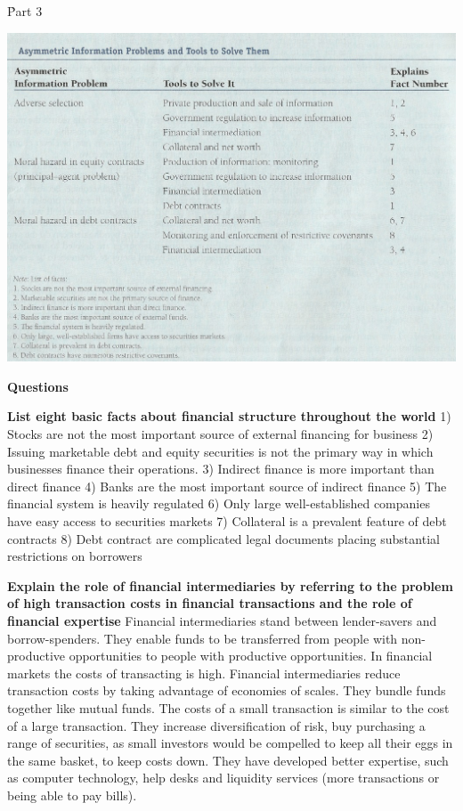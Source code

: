 \documentclass[12pt]{examnotes}
\begin{document}
\h{Part 3}
\begin{center}
  \includegraphics[scale=0.5]{./imgs/part3table.jpg}
\end{center}


\textbf{Questions}

\textbf{List eight basic facts about financial structure throughout the world}
1) Stocks are not the most important source of external financing for business
2) Issuing marketable debt and equity securities is not the primary way in which businesses finance their operations.
3) Indirect finance is more important than direct finance
4) Banks are the most important source of indirect finance
5) The financial system is heavily regulated
6) Only large well-established companies have easy access to securities markets
7) Collateral is a prevalent feature of debt contracts
8) Debt contract are complicated legal documents placing substantial restrictions on borrowers 

\textbf{Explain the role of financial intermediaries by referring to the problem of high transaction costs in financial transactions and the role of financial expertise}
Financial intermediaries stand between lender-savers and borrow-spenders. They enable funds to be transferred from people with non-productive opportunities to people with productive opportunities. In financial markets the costs of transacting is high. Financial intermediaries reduce transaction costs by taking advantage of economies of scales. They bundle funds together like mutual funds. The costs of a small transaction is similar to the cost of a large transaction. They increase diversification of risk, buy purchasing a range of securities, as small investors would be compelled to keep all their eggs in the same basket, to keep costs down. They have developed better expertise, such as computer technology, help desks and liquidity services (more transactions or being able to pay bills).
\end{document}
